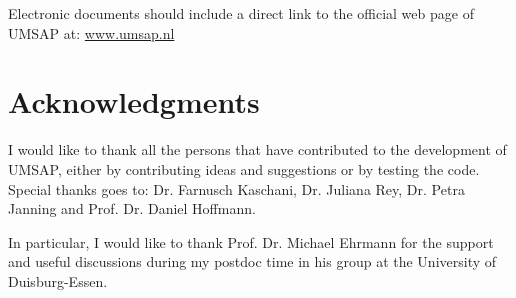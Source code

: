 Electronic documents should include a direct link to the official web page of UMSAP at: \href{https://www.umsap.nl}{www.umsap.nl}

\section{Acknowledgments}

I would like to thank all the persons that have contributed to the development of UMSAP, either by contributing ideas and suggestions or by testing the code. Special thanks goes to: Dr. Farnusch Kaschani, Dr. Juliana Rey, Dr. Petra Janning and Prof. Dr. Daniel Hoffmann.

In particular, I would like to thank Prof. Dr. Michael Ehrmann for the support and useful discussions during my postdoc time in his group at the University of Duisburg-Essen. 

